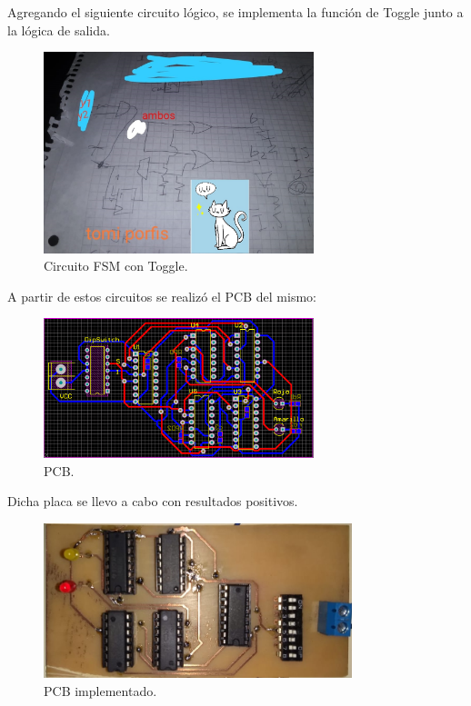 Agregando el siguiente circuito lógico, se implementa la función de Toggle junto a la lógica de salida.
\begin{figure}[H]
	\centering
	\includegraphics[width=0.7\textwidth]{ImagenesEjercicio1/post_logic.jpeg}
	\caption{Circuito FSM con Toggle.}
	\label{fig:fsm2}
\end{figure}
A partir de estos circuitos se realizó el PCB del mismo:
 \begin{figure}[H]
	\centering
	\includegraphics[width=0.7\textwidth]{ImagenesEjercicio1/PCB.PNG}
	\caption{PCB.}
	\label{fig:fsm}
\end{figure}
Dicha placa se llevo a cabo con resultados positivos.
 \begin{figure}[H]
	\centering
	\includegraphics[width=0.8\textwidth]{ImagenesEjercicio1/pcbReal.jpeg}
	\caption{PCB implementado.}
	\label{fig:fsm}
\end{figure}
